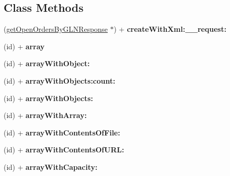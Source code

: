 \subsection*{Class Methods}
\begin{DoxyCompactItemize}
\item 
\hypertarget{interfaceget_open_orders_by_g_l_n_response_af96d3d57cd47b0f50c6cc0977ab6cff4}{}(\hyperlink{interfaceget_open_orders_by_g_l_n_response}{get\+Open\+Orders\+By\+G\+L\+N\+Response} $\ast$) + {\bfseries create\+With\+Xml\+:\+\_\+\+\_\+request\+:}\label{interfaceget_open_orders_by_g_l_n_response_af96d3d57cd47b0f50c6cc0977ab6cff4}

\item 
\hypertarget{interfaceget_open_orders_by_g_l_n_response_a3d8dfcf8ee718b5b476c9ceb40e3cf2f}{}(id) + {\bfseries array}\label{interfaceget_open_orders_by_g_l_n_response_a3d8dfcf8ee718b5b476c9ceb40e3cf2f}

\item 
\hypertarget{interfaceget_open_orders_by_g_l_n_response_a33f1f72e2f460cd2828338370c9b4d55}{}(id) + {\bfseries array\+With\+Object\+:}\label{interfaceget_open_orders_by_g_l_n_response_a33f1f72e2f460cd2828338370c9b4d55}

\item 
\hypertarget{interfaceget_open_orders_by_g_l_n_response_af4cd066630a7c9d6b827b4e306eaecc8}{}(id) + {\bfseries array\+With\+Objects\+:count\+:}\label{interfaceget_open_orders_by_g_l_n_response_af4cd066630a7c9d6b827b4e306eaecc8}

\item 
\hypertarget{interfaceget_open_orders_by_g_l_n_response_aa0bee97acaf60d4bd3ba92ab2229970a}{}(id) + {\bfseries array\+With\+Objects\+:}\label{interfaceget_open_orders_by_g_l_n_response_aa0bee97acaf60d4bd3ba92ab2229970a}

\item 
\hypertarget{interfaceget_open_orders_by_g_l_n_response_a8ce0fa9f95b3f5f69d76ad85175f5ab1}{}(id) + {\bfseries array\+With\+Array\+:}\label{interfaceget_open_orders_by_g_l_n_response_a8ce0fa9f95b3f5f69d76ad85175f5ab1}

\item 
\hypertarget{interfaceget_open_orders_by_g_l_n_response_a7a0a8477396d9d670a70bafcb2709edf}{}(id) + {\bfseries array\+With\+Contents\+Of\+File\+:}\label{interfaceget_open_orders_by_g_l_n_response_a7a0a8477396d9d670a70bafcb2709edf}

\item 
\hypertarget{interfaceget_open_orders_by_g_l_n_response_a793cadc4cf4facfaff9ab20de9a19ee4}{}(id) + {\bfseries array\+With\+Contents\+Of\+U\+R\+L\+:}\label{interfaceget_open_orders_by_g_l_n_response_a793cadc4cf4facfaff9ab20de9a19ee4}

\item 
\hypertarget{interfaceget_open_orders_by_g_l_n_response_ab7b2ff79ce6ae424f48cd49eb505e5ff}{}(id) + {\bfseries array\+With\+Capacity\+:}\label{interfaceget_open_orders_by_g_l_n_response_ab7b2ff79ce6ae424f48cd49eb505e5ff}

\end{DoxyCompactItemize}
